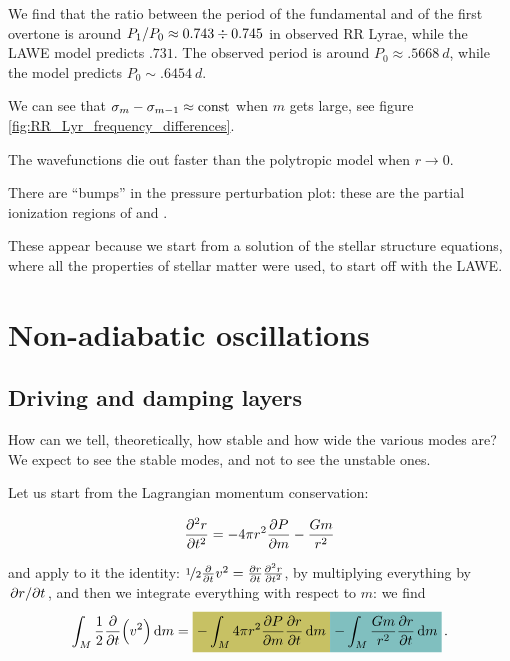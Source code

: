 \documentclass[main.tex]{subfiles}
\begin{document}
We find that the ratio between the period of the fundamental and of the first overtone is around \(P_1 / P_0 \approx \num{.743} \divisionsymbol \num{.745}\) in observed RR Lyrae, while the LAWE model predicts \(\num{.731}\). 
The observed period is around \(P_0 \approx \SI{.5668}{d}\), while the model predicts \(P_0 \sim \SI{.6454}{d}\). 

We can see that \(\sigma_m - \sigma_{m-1} \approx \text{const}\) when \(m\) gets large, see figure \ref{fig:RR_Lyr_frequency_differences}.
  

The wavefunctions die out faster than the polytropic model when \(r \rightarrow 0\).

There are ``bumps'' in the pressure perturbation plot: these are the partial ionization regions of  and .

These appear because we start from a solution of the stellar structure equations, where all the properties of stellar matter were used, to start off with the LAWE.

\section{Non-adiabatic oscillations}

\subsection{Driving and damping layers}

How can we tell, theoretically, how stable and how wide the various modes are?
We expect to see the stable modes, and not to see the unstable ones.

Let us start from the Lagrangian momentum conservation:

\begin{equation}
    \pdv[2]{r}{t} = - 4 \pi r^2 \pdv{P}{m} - \frac{Gm}{r^2}
\end{equation}

and apply to it the identity: \(\frac[i]{1}{2} \pdv{}{t} v^2 = \pdv{r}{t} \pdv[2]{r}{t}\), by multiplying everything by \(\pdv*{r}{t} \), and then we integrate everything with respect to \(m\): we find 
%
\begin{align}
\int_{M} \frac{1}{2} \pdv{}{t} \qty(v^2) \dd{m} = 
\hlc{olive}{- \int_{M} 4 \pi r^2 \pdv{P}{m} \pdv{r}{t} \dd{m} }
\hlc{teal}{- \int_{M} \frac{Gm}{r^2} \pdv{r}{t} \dd{m}}
\,.
\end{align}
%
\end{document}
